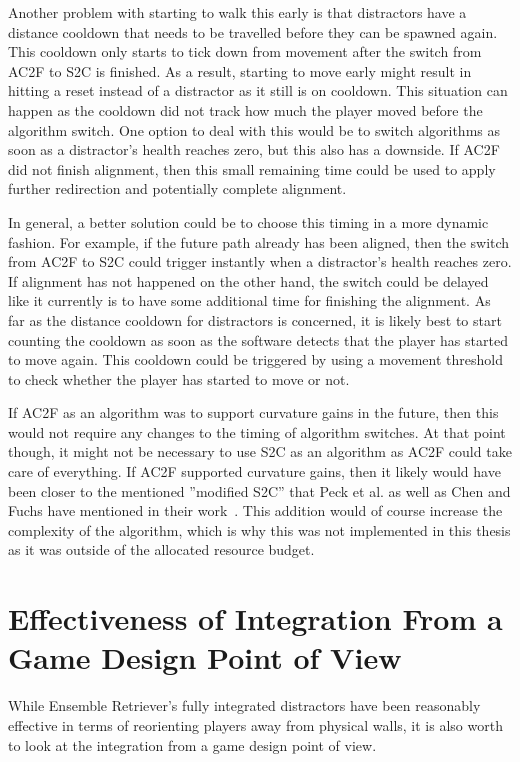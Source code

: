 Another problem with starting to walk this early is that distractors have a distance cooldown that needs to be travelled before they can be spawned again. This cooldown only starts to tick down from movement after the switch from AC2F to S2C is finished. As a result, starting to move early might result in hitting a reset instead of a distractor as it still is on cooldown. This situation can happen as the cooldown did not track how much the player moved before the algorithm switch. One option to deal with this would be to switch algorithms as soon as a distractor's health reaches zero, but this also has a downside. If AC2F did not finish alignment, then this small remaining time could be used to apply further redirection and potentially complete alignment. 

In general, a better solution could be to choose this timing in a more dynamic fashion. For example, if the future path already has been aligned, then the switch from AC2F to S2C could trigger instantly when a distractor's health reaches zero. If alignment has not happened on the other hand, the switch could be delayed like it currently is to have some additional time for finishing the alignment. As far as the distance cooldown for distractors is concerned, it is likely best to start counting the cooldown as soon as the software detects that the player has started to move again. This cooldown could be triggered by using a movement threshold to check whether the player has started to move or not.  

If AC2F as an algorithm was to support curvature gains in the future, then this would not require any changes to the timing of algorithm switches. At that point though, it might not be necessary to use S2C as an algorithm as AC2F could take care of everything. If AC2F supported curvature gains, then it likely would have been closer to the mentioned ''modified S2C'' that Peck et al. as well as Chen and Fuchs have mentioned in their work~\cite{peck2010improved, chen2017towards, chen2017supporting}. This addition would of course increase the complexity of the algorithm, which is why this was not implemented in this thesis as it was outside of the allocated resource budget.

\section{Effectiveness of Integration From a Game Design Point of View}
While Ensemble Retriever's fully integrated distractors have been reasonably effective in terms of reorienting players away from physical walls, it is also worth to look at the integration from a game design point of view. 

